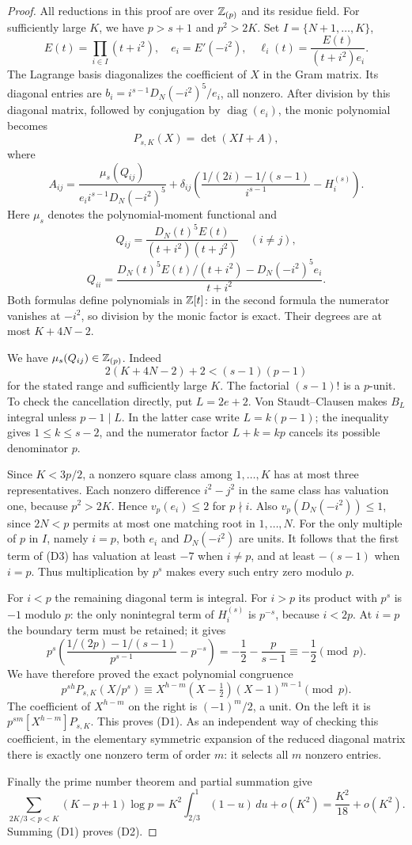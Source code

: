 \begin{proof}
All reductions in this proof are over $\mathbb Z_{(p)}$ and its residue field.
For sufficiently large $K$, we have $p>s+1$ and $p^2>2K$.
Set $I=\{N+1,\ldots,K\}$,
\[
 E(t)=\prod_{i\in I}(t+i^2),\quad e_i=E'(-i^2),\quad
 \ell_i(t)=\frac{E(t)}{(t+i^2)e_i}.
\]
The Lagrange basis diagonalizes the coefficient of $X$ in the Gram
matrix. Its diagonal entries are
$b_i=i^{s-1}D_N(-i^2)^5/e_i$, all nonzero.
After division by this diagonal matrix, followed by conjugation by
$\operatorname{diag}(e_i)$, the monic polynomial becomes
\[
 P_{s,K}(X)=\det(XI+A),
\]
where
\[
 A_{ij}=\frac{\mu_s(Q_{ij})}
 {e_i i^{s-1}D_N(-i^2)^5}
 +\delta_{ij}\left(
 \frac{1/(2i)-1/(s-1)}{i^{s-1}}-H_i^{(s)}\right).       \tag{D3}
\]
Here $\mu_s$ denotes the polynomial-moment functional and
\[
 Q_{ij}=\frac{D_N(t)^5E(t)}{(t+i^2)(t+j^2)}\quad(i\ne j),
\]
\[
 Q_{ii}=\frac{D_N(t)^5 E(t)/(t+i^2)-D_N(-i^2)^5e_i}
 {t+i^2}.
\]
Both formulas define polynomials in $\mathbb Z[t]$: in the second formula
the numerator vanishes at $-i^2$, so division by the monic factor is
exact. Their degrees are at most $K+4N-2$.

We have $\mu_s(Q_{ij})\in\mathbb Z_{(p)}$. Indeed
\[
 2(K+4N-2)+2 < (s-1)(p-1)
\]
for the stated range and sufficiently large $K$. The factorial
$(s-1)!$ is a $p$-unit. To check the cancellation directly,
put $L=2e+2$. Von Staudt--Clausen makes $B_L$ integral unless
$p-1\mid L$. In the latter case write $L=k(p-1)$; the inequality
gives $1\le k\le s-2$, and the numerator factor $L+k=kp$ cancels
its possible denominator $p$.

Since $K<3p/2$, a nonzero square class among $1,\ldots,K$ has at most
three representatives. Each nonzero difference $i^2-j^2$ in the same
class has valuation one, because $p^2>2K$. Hence
$v_p(e_i)\le2$ for $p\nmid i$. Also
$v_p(D_N(-i^2))\le1$, since $2N<p$ permits at most one matching
root in $1,\ldots,N$. For the only multiple of $p$ in $I$, namely
$i=p$, both $e_i$ and $D_N(-i^2)$ are units.
It follows that the first term of (D3) has valuation at least $-7$
when $i\ne p$, and at least $-(s-1)$ when $i=p$.
Thus multiplication by $p^s$ makes every such entry zero modulo $p$.

For $i<p$ the remaining diagonal term is integral. For $i>p$ its
product with $p^s$ is $-1$ modulo $p$: the only nonintegral term of
$H_i^{(s)}$ is $p^{-s}$, because $i<2p$.
At $i=p$ the boundary term must be retained; it gives
\[
 p^s\left(
 \frac{1/(2p)-1/(s-1)}{p^{s-1}}-p^{-s}
 \right)=-\frac12-\frac{p}{s-1}\equiv-\frac12\pmod p.
\]
We have therefore proved the exact polynomial congruence
\[
 p^{sh}P_{s,K}(X/p^s)
 \equiv X^{h-m}(X-\tfrac12)(X-1)^{m-1}\pmod p.         \tag{D4}
\]
The coefficient of $X^{h-m}$ on the right is $(-1)^m/2$, a unit.
On the left it is $p^{sm}[X^{h-m}]P_{s,K}$. This proves (D1).
As an independent way of checking this coefficient, in the elementary
symmetric expansion of the reduced diagonal matrix there is exactly
one nonzero term of order $m$: it selects all $m$ nonzero entries.

Finally the prime number theorem and partial summation give
\[
 \sum_{2K/3<p<K}(K-p+1)\log p
 =K^2\int_{2/3}^1(1-u)\,du+o(K^2)
 =\frac{K^2}{18}+o(K^2).
\]
Summing (D1) proves (D2).
\end{proof}


